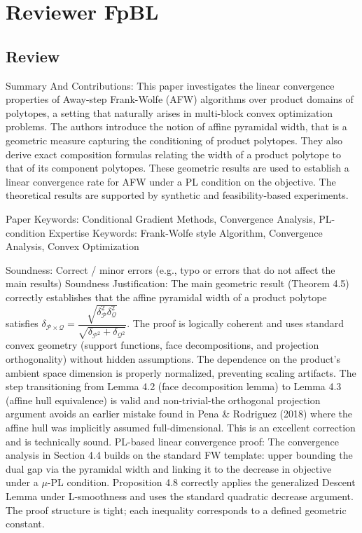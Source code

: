 \documentclass[a4wide]{article}
\begin{document}
\section*{Reviewer FpBL}

\subsection*{Review}
Summary And Contributions:
This paper investigates the linear convergence properties of Away-step Frank-Wolfe (AFW) algorithms over product domains of polytopes, a setting that naturally arises in multi-block convex optimization problems. The authors introduce the notion of affine pyramidal width, that is a geometric measure capturing the conditioning of product polytopes. They also derive exact composition formulas relating the width of a product polytope to that of its component polytopes. These geometric results are used to establish a linear convergence rate for AFW under a PL condition on the objective. The theoretical results are supported by synthetic and feasibility-based experiments.

Paper Keywords: Conditional Gradient Methods, Convergence Analysis, PL-condition
Expertise Keywords: Frank-Wolfe style Algorithm, Convergence Analysis, Convex Optimization

Soundness: Correct / minor errors (e.g., typo or errors that do not affect the main results)
Soundness Justification:
The main geometric result (Theorem 4.5) correctly establishes that the affine pyramidal width of a product polytope satisfies $\delta_{\mathcal{P} \times \mathcal{Q}} = \dfrac{\sqrt{\delta_{\mathcal{P}}^2 \delta_{\mathcal{Q}}^2 }}{\sqrt{\delta_{\mathcal{P}^2} + \delta_{\mathcal{Q}^2}}}$.
The proof is logically coherent and uses standard convex geometry (support functions, face decompositions, and projection orthogonality) without hidden assumptions. The dependence on the product's ambient space dimension is properly normalized, preventing scaling artifacts. The step transitioning from Lemma 4.2 (face decomposition lemma) to Lemma 4.3 (affine hull equivalence) is valid and non-trivial-the orthogonal projection argument avoids an earlier mistake found in Pena \& Rodriguez (2018) where the affine hull was implicitly assumed full-dimensional. This is an excellent correction and is technically sound.
PL-based linear convergence proof: The convergence analysis in Section 4.4 builds on the standard FW template: upper bounding the dual gap via the pyramidal width and linking it to the decrease in objective under a $\mu$-PL condition. Proposition 4.8 correctly applies the generalized Descent Lemma under L-smoothness and uses the standard quadratic decrease argument. The proof structure is tight; each inequality corresponds to a defined geometric constant.
\end{document}
